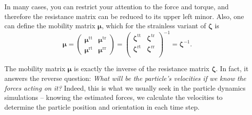 \documentclass{master_thesis}
\begin{document}
In many cases, you can restrict your attention to the force and torque, and therefore the resistance matrix can be reduced to its upper left minor. Also, one can define the mobility matrix $\bm{\mu}$, which for the strainless variant of $\bm{\zeta}$ is
\begin{equation}
    \bm{\mu}=\begin{pmatrix}
    \bm{\mu}^{\textrm{tt}} & \bm{\mu}^{\textrm{tr}}\\
    \bm{\mu}^{\textrm{rt}} & \bm{\mu}^{\textrm{rr}}
    \end{pmatrix}=\begin{pmatrix}
    \bm{\zeta}^{\textrm{tt}} & \bm{\zeta}^{\textrm{tr}}\\
    \bm{\zeta}^{\textrm{rt}} & \bm{\zeta}^{\textrm{rr}}\\
    \end{pmatrix}^{-1}=\bm{\zeta}^{-1}.
\label{eqn:mobility_matrix}
\end{equation}

The mobility matrix $\bm{\mu}$ is exactly the inverse of the resistance matrix $\bm{\zeta}$. In fact, it answers the reverse question: \textit{What will be the particle's velocities if we know the forces acting on it?} Indeed, this is what we usually seek in the particle dynamics simulations -- knowing the estimated forces, we calculate the velocities to determine the particle position and orientation in each time step.
\end{document}
